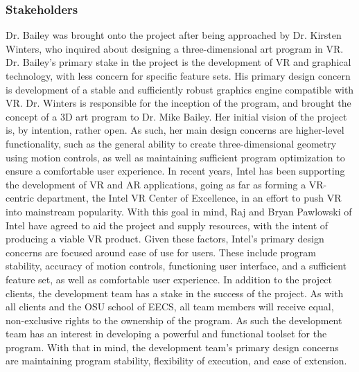 \documentclass[onecolumn, draftclsnofoot,10pt, compsoc]{IEEEtran}
\newcounter{threesection}[subsubsection]
\begin{document}

\subsubsection{Stakeholders}

Dr. Bailey was brought onto the project after being approached by Dr. Kirsten Winters, who inquired about designing a three-dimensional art program in VR.
Dr. Bailey’s primary stake in the project is the development of VR and graphical technology, with less concern for specific feature sets.
His primary design concern is development of a stable and sufficiently robust graphics engine compatible with VR.
Dr. Winters is responsible for the inception of the program, and brought the concept of a 3D art program to Dr. Mike Bailey.
Her initial vision of the project is, by intention, rather open.
As such, her main design concerns are higher-level functionality, such as the general ability to create three-dimensional geometry using motion controls, as well as maintaining sufficient program optimization to ensure a comfortable user experience.
In recent years, Intel has been supporting the development of VR and AR applications, going as far as forming a VR-centric department, the Intel VR Center of Excellence, in an effort to push VR into mainstream popularity.
With this goal in mind, Raj and Bryan Pawlowski of Intel have agreed to aid the project and supply resources, with the intent of producing a viable VR product.
Given these factors, Intel’s primary design concerns are focused around ease of use for users.
These include program stability, accuracy of motion controls, functioning user interface, and a sufficient feature set, as well as comfortable user experience. 
In addition to the project clients, the development team has a stake in the success of the project.
As with all clients and the OSU school of EECS, all team members will receive equal, non-exclusive rights to the ownership of the program.
As such the development team has an interest in developing a powerful and functional toolset for the program.
With that in mind, the development team’s primary design concerns are maintaining program stability, flexibility of execution, and ease of extension.
\end{document}
